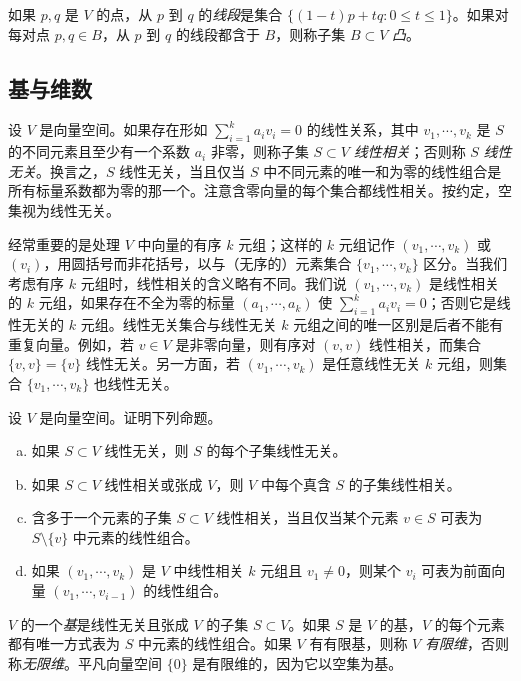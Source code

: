 \documentclass[../../main.tex]{subfiles}
\begin{document}
如果 $p,q$ 是 $V$ 的点，从 $p$ 到 $q$ 的\emph{线段}是集合 $\{(1-t)p+tq:0\leqslant t\leqslant1\}$。如果对每对点 $p,q\in B$，从 $p$ 到 $q$ 的线段都含于 $B$，则称子集 $B\subset V$ \emph{凸}。

\subsection*{基与维数}

设 $V$ 是向量空间。如果存在形如 $\sum_{i=1}^k a_i v_i=0$ 的线性关系，其中 $v_1,\cdots ,v_k$ 是 $S$ 的不同元素且至少有一个系数 $a_i$ 非零，则称子集 $S\subset V$ \emph{线性相关}；否则称 $S$ \emph{线性无关}。换言之，$S$ 线性无关，当且仅当 $S$ 中不同元素的唯一和为零的线性组合是所有标量系数都为零的那一个。注意含零向量的每个集合都线性相关。按约定，空集视为线性无关。

经常重要的是处理 $V$ 中向量的有序 $k$ 元组；这样的 $k$ 元组记作 $(v_1,\cdots ,v_k)$ 或 $(v_i)$，用圆括号而非花括号，以与（无序的）元素集合 $\{v_1,\cdots ,v_k\}$ 区分。当我们考虑有序 $k$ 元组时，线性相关的含义略有不同。我们说 $(v_1,\cdots ,v_k)$ 是线性相关的 $k$ 元组，如果存在不全为零的标量 $(a_1,\cdots ,a_k)$ 使 $\sum_{i=1}^k a_i v_i=0$；否则它是线性无关的 $k$ 元组。线性无关集合与线性无关 $k$ 元组之间的唯一区别是后者不能有重复向量。例如，若 $v\in V$ 是非零向量，则有序对 $(v,v)$ 线性相关，而集合 $\{v,v\}=\{v\}$ 线性无关。另一方面，若 $(v_1,\cdots ,v_k)$ 是任意线性无关 $k$ 元组，则集合 $\{v_1,\cdots ,v_k\}$ 也线性无关。

\begin{exercise}\label{exercise:appB-B-1}
设 $V$ 是向量空间。证明下列命题。
\begin{enumerate}[(a)]
\item 如果 $S\subset V$ 线性无关，则 $S$ 的每个子集线性无关。
\item 如果 $S\subset V$ 线性相关或张成 $V$，则 $V$ 中每个真含 $S$ 的子集线性相关。
\item 含多于一个元素的子集 $S\subset V$ 线性相关，当且仅当某个元素 $v\in S$ 可表为 $S\setminus\{v\}$ 中元素的线性组合。
\item 如果 $(v_1,\cdots ,v_k)$ 是 $V$ 中线性相关 $k$ 元组且 $v_1\neq0$，则某个 $v_i$ 可表为前面向量 $(v_1,\cdots ,v_{i-1})$ 的线性组合。
\end{enumerate}
\end{exercise}

$V$ 的一个\emph{基}是线性无关且张成 $V$ 的子集 $S\subset V$。如果 $S$ 是 $V$ 的基，$V$ 的每个元素都有唯一方式表为 $S$ 中元素的线性组合。如果 $V$ 有有限基，则称 $V$ \emph{有限维}，否则称\emph{无限维}。平凡向量空间 $\{0\}$ 是有限维的，因为它以空集为基。
\end{document}
